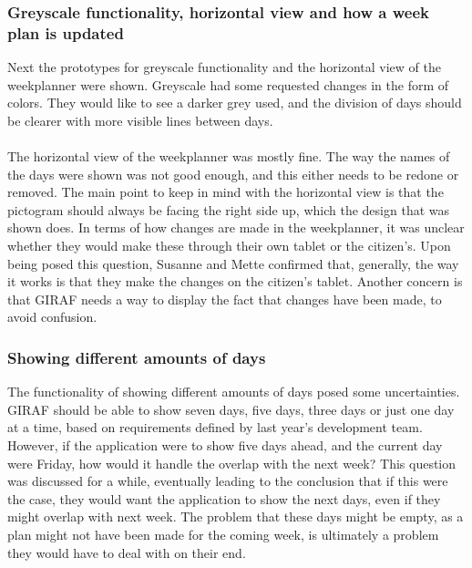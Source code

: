 \subsubsection{Greyscale functionality, horizontal view and how a week plan is updated}
Next the prototypes for greyscale functionality and the horizontal view of the weekplanner were shown.
Greyscale had some requested changes in the form of colors.
They would like to see a darker grey used, and the division of days should be clearer with more visible lines between days.
\\\\
The horizontal view of the weekplanner was mostly fine.
The way the names of the days were shown was not good enough, and this either needs to be redone or removed.
The main point to keep in mind with the horizontal view is that the pictogram should always be facing the right side up, which the design that was shown does.
In terms of how changes are made in the weekplanner, it was unclear whether they would make these through their own tablet or the citizen's.
Upon being posed this question, Susanne and Mette confirmed that, generally, the way it works is that they make the changes on the citizen's tablet.
Another concern is that GIRAF needs a way to display the fact that changes have been made, to avoid confusion.


\subsubsection{Showing different amounts of days}
The functionality of showing different amounts of days posed some uncertainties.
GIRAF should be able to show seven days, five days, three days or just one day at a time, based on requirements defined by last year's development team.
However, if the application were to show five days ahead, and the current day were Friday, how would it handle the overlap with the next week?
This question was discussed for a while, eventually leading to the conclusion that if this were the case, they would want the application to show the next days, even if they might overlap with next week.
The problem that these days might be empty, as a plan might not have been made for the coming week, is ultimately a problem they would have to deal with on their end.

